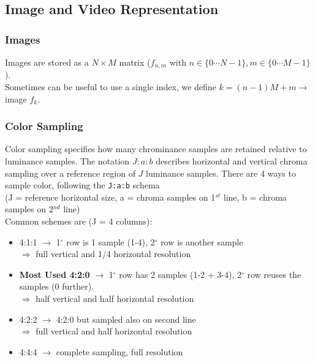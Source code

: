   \subsection{Image and Video Representation}
\subsubsection{Images}
Images are stored as a $N\times M$ matrix ($f_{n,m}$ with $n \in \{0 \cdots N-1\}, m \in \{0 \cdots M-1\}$).\\
Sometimes can be useful to use a single index, we define $k = (n-1)M + m \to$ image $f_k$.
\subsubsection{Color Sampling}
Color sampling specifies how many chrominance samples are retained relative to luminance samples. The notation $J:a:b$ describes horizontal and vertical chroma sampling over a reference region of $J$ luminance samples.
There are 4 ways to sample color, following the \verb|J:a:b| schema\\
(J = reference horizontal size, a = chroma samples on 1$^{st}$ line, b = chroma samples on 2$^{nd}$ line)\\
Common schemes are (J = 4 columns):
\begin{itemize}
    \item 4:1:1 $\to$ 1$^\circ$ row is 1 sample (1-4), 2$^\circ$ row is another sample\\
        $\Rightarrow$ full vertical and 1/4 horizontal resolution
    \item \textbf{Most Used 4:2:0} $\to$ 1$^\circ$ row has 2 samples (1-2 + 3-4), 2$^\circ$ row reuses the samples (0 further).\\
        $\Rightarrow$ half vertical and half horizontal resolution
    \item 4:2:2 $\to$ 4:2:0 but sampled also on second line\\
        $\Rightarrow$ full vertical and half horizontal resolution
    \item 4:4:4 $\to$ complete sampling, full resolution
\end{itemize}
